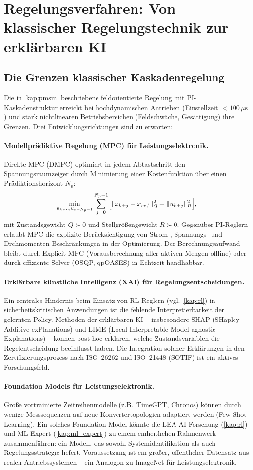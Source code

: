 ﻿\documentclass[a4paper,12pt,openany,oneside]{book}
\newcommand{\abschnitt}[1]{\section{#1}}
\newcommand{\unterabschnitt}[1]{\subsection{#1}}
\theoremstyle{definition}
\begin{document}
\abschnitt{Regelungsverfahren: Von klassischer Regelungstechnik zur erkl\"arbaren KI}

\unterabschnitt{Die Grenzen klassischer Kaskadenregelung}

Die in \autoref{kap:pmsm} beschriebene feldorientierte Regelung mit PI-Kaskadenstruktur
erreicht bei hochdynamischen Antrieben (Einstellzeit $< 100\,\mu\mathrm{s}$) und stark
nichtlinearen Betriebsbereichen (Feldschw\"ache, Ges\"attigung) ihre Grenzen. Drei
Entwicklungsrichtungen sind zu erwarten:

\paragraph{Modellpr\"adiktive Regelung (MPC) f\"ur Leistungselektronik.}
Direkte MPC (DMPC) optimiert in jedem Abtastschritt den Spannungsraumzeiger durch
Minimierung einer Kostenfunktion \"uber einen Pr\"adiktionshorizont $N_p$:
\[
  \min_{u_k,\ldots,u_{k+N_p-1}} \sum_{j=0}^{N_p-1}
  \Bigl[\|x_{k+j} - x_{ref}\|_Q^2 + \|u_{k+j}\|_R^2\Bigr],
\]
mit Zustandsgewicht $Q \succ 0$ und Stellgr\"o\ss{}engewicht $R \succ 0$.
Gegen\"uber PI-Reglern erlaubt MPC die explizite Ber\"ucksichtigung von Strom-,
Spannungs- und Drehmomenten-Beschr\"ankungen in der Optimierung.
Der Berechnungsaufwand bleibt durch Explicit-MPC (Vorausberechnung aller aktiven
Mengen offline) oder durch effiziente Solver (OSQP, qpOASES) in Echtzeit handhabbar.

\paragraph{Erkl\"arbare k\"unstliche Intelligenz (XAI) f\"ur Regelungsentscheidungen.}
Ein zentrales Hindernis beim Einsatz von RL-Reglern (vgl.\ \autoref{kap:rl}) in
sicherheitskritischen Anwendungen ist die fehlende Interpretierbarkeit der gelernten Policy.
Methoden der erkl\"arbaren KI -- insbesondere SHAP (SHapley Additive exPlanations) und
LIME (Local Interpretable Model-agnostic Explanations) -- k\"onnen post-hoc erkl\"aren,
welche Zustandsvariablen die Regelentscheidung beeinflusst haben. Die Integration solcher
Erkl\"arungen in den Zertifizierungsprozess nach ISO~26262 und ISO~21448 (SOTIF) ist
ein aktives Forschungsfeld.

\paragraph{Foundation Models f\"ur Leistungselektronik.}
Gro\ss{}e vortrainierte Zeitreihenmodelle (z.B.\ TimeGPT, Chronos) k\"onnen durch
wenige Messsequenzen auf neue Konverterto\-po\-logien adaptiert werden (Few-Shot Learning).
Ein solches Foundation Model k\"onnte die LEA-AI-Forschung (\autoref{kap:rl}) und
ML-Expert (\autoref{kap:ml_expert}) zu einem einheitlichen Rahmenwerk zusammenf\"uhren:
ein Modell, das sowohl Systemidentifikation als auch Regelungsstrategie liefert.
Voraussetzung ist ein gro\ss{}er, \"offentlicher Datensatz aus realen Antriebssystemen --
ein Analogon zu ImageNet f\"ur Leistungselektronik.
\end{document}
